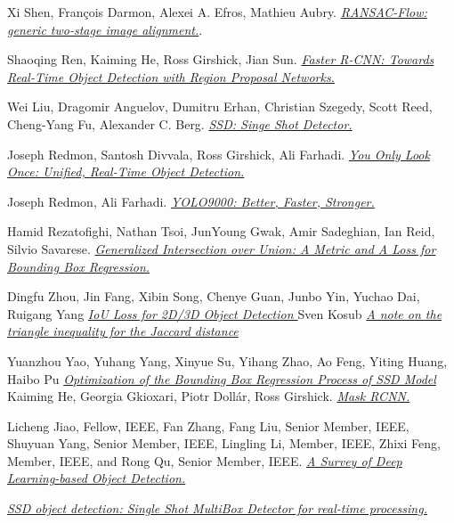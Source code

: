 \documentclass[12pt]{article}
\begin{document}
\begin{thebibliography}{9}
Xi Shen, François Darmon, Alexei A. Efros, Mathieu Aubry.
\textit{\href{https://arxiv.org/abs/2004.01526}{RANSAC-Flow: generic two-stage image alignment.}}.

Shaoqing Ren, Kaiming He, Ross Girshick, Jian Sun.
\textit{\href{https://arxiv.org/abs/1506.01497}{Faster R-CNN: Towards Real-Time Object Detection with Region Proposal Networks.}}

Wei Liu, Dragomir Anguelov, Dumitru Erhan, Christian Szegedy, Scott Reed, Cheng-Yang Fu, Alexander C. Berg.
\textit{\href{https://arxiv.org/abs/1512.02325}{SSD: Singe Shot Detector.}}

Joseph Redmon, Santosh Divvala, Ross Girshick, Ali Farhadi.
\textit{\href{https://arxiv.org/abs/1506.02640}{You Only Look Once: Unified, Real-Time Object Detection.}}

Joseph Redmon, Ali Farhadi.
\textit{\href{https://arxiv.org/abs/1612.08242}{YOLO9000: Better, Faster, Stronger.}}

Hamid Rezatofighi, Nathan Tsoi, JunYoung Gwak, Amir Sadeghian, Ian Reid, Silvio Savarese.
\textit{\href{https://arxiv.org/abs/1902.09630}{Generalized Intersection over Union: A Metric and A Loss for Bounding Box Regression.}}

Dingfu Zhou, Jin Fang, Xibin Song, Chenye Guan, Junbo Yin, Yuchao Dai, Ruigang Yang
\textit{\href{https://arxiv.org/abs/1908.03851}{IoU Loss for 2D/3D Object Detection
}}
Sven Kosub
\textit{\href{https://arxiv.org/pdf/1612.02696.pdf
}{A note on the triangle inequality for the Jaccard distance}}


Yuanzhou Yao, Yuhang Yang, Xinyue Su, Yihang Zhao, Ao Feng, Yiting Huang, Haibo Pu
\textit{\href{https://www.atlantis-press.com/proceedings/iccia-19/125913142}{Optimization of the Bounding Box Regression Process of SSD Model
}}
Kaiming He, Georgia Gkioxari, Piotr Dollár, Ross Girshick.
\textit{\href{https://arxiv.org/pdf/1703.06870.pdf}{Mask RCNN.}}

Licheng Jiao, Fellow, IEEE, Fan Zhang, Fang Liu, Senior Member, IEEE, Shuyuan Yang, Senior Member, IEEE, Lingling Li, Member, IEEE, Zhixi Feng, Member, IEEE, and Rong Qu, Senior Member, IEEE.
\textit{\href{https://arxiv.org/pdf/1907.09408.pdf}{A Survey of Deep Learning-based Object Detection.
}}

\textit{\href{https://jonathan-hui.medium.com/ssd-object-detection-single-shot-multibox-detector-for-real-time-processing-9bd8deac0e06}{SSD object detection: Single Shot MultiBox Detector for real-time processing.
}}

\end{thebibliography}
\end{document}
